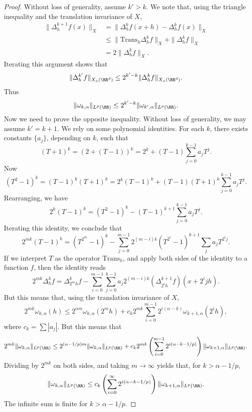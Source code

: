 \begin{proof}
    Without loss of generality, assume $k' > k$. We note that, using the triangle inequality and the translation invariance of $X$,
    \begin{align*}
        \| \Delta_h^{k+1} f(x) \|_X &= \| \Delta^k_h f(x + h) - \Delta^k_h f(x) \|_X\\
        &\leq \| \text{Trans}_h \Delta^k_h f \|_X + \| \Delta^k_h f \|_X \\
        &= 2 \| \Delta^k_h f \|_X.
    \end{align*}
    Iterating this argument shows that
    \[ \| \Delta^{k'}_h f \|_{X_x(\RR^d)} \leq 2^{k' - k} \| \Delta^k_h f \|_{X_x(\RR^d)}. \]
    Thus 
    \[ \| \omega_{k,\alpha} \|_{L^p(\RR)} \leq 2^{k' - k} \| \omega_{k',\alpha} \|_{L^p(\RR)}. \]
    Now we need to prove the opposite inequality. Without loss of generality, we may assume $k' = k + 1$. We rely on some polynomial identities. For each $k$, there exists constants $\{ a_j \}$, depending on $k$, such that
    \[ (T + 1)^k = ( 2 + (T - 1) )^k = 2^k + (T - 1) \sum_{j = 0}^{k-1} a_j T^j. \]
    Now
    \[ (T^2 - 1)^k = (T - 1)^k (T + 1)^k = 2^k (T - 1)^k + (T - 1) (T + 1)^k \sum_{j = 0}^{k-1} a_j T^j. \]
    Rearranging, we have
    \[ 2^k (T - 1)^k = (T^2 - 1)^k - (T - 1)^{k+1} \sum_{j = 0}^{k-1} a_j T^j. \]
    Iterating this identity, we conclude that
    \[ 2^{mk} ( T - 1 )^k = (T^{2^m} - 1)^k - \sum_{j = 0}^{m-1} 2^{(m - i)k} (T^{2^i} - 1)^{k+1} \sum_j a_j T^{2^i j}. \]
    If we interpret $T$ as the operator $\text{Trans}_h$, and apply both sides of the identity to a function $f$, then the identity reads
    \[ 2^{mk} \Delta_h^k f = \Delta_{2^m h}^k f - \sum_{i = 0}^{m-1} \sum_{j = 0}^{k-1} a_j 2^{(m-i)k} (\Delta_{2^i h}^{k+1} f)(x + 2^i j h). \]
    But this means that, using the translation invariance of $X$,
    \[ 2^{mk} \omega_{k,\alpha}(h) \leq 2^{\alpha m} \omega_{k,\alpha}(2^m h) + c_k 2^{mk} \sum_{i = 0}^{m-1} 2^{i(\alpha - k)} \omega_{k+1,\alpha}(2^i h), \]
    where $c_k = \sum |a_j|$. But this means that
    \[ 2^{mk} \| \omega_{k,\alpha} \|_{L^p(\RR)} \leq 2^{(\alpha - 1/p) m} \| \omega_{k,\alpha} \|_{L^p(\RR)} + c_k 2^{mk} \left( \sum_{i = 0}^{m-1} 2^{i(\alpha - k - 1/p)} \right) \| \omega_{k+1,\alpha} \|_{L^p(\RR)}. \]
    Dividing by $2^{mk}$ on both sides, and taking $m \to \infty$ yields that, for $k > \alpha - 1/p$,
    \[ \| \omega_{k,\alpha} \|_{L^p(\RR)} \leq c_k \left( \sum_{i = 0}^\infty 2^{i(\alpha - k - 1/p)} \right) \| \omega_{k+1,\alpha} \|_{L^p(\RR)}. \]
    The infinite sum is finite for $k > \alpha - 1/p$.
\end{proof}


